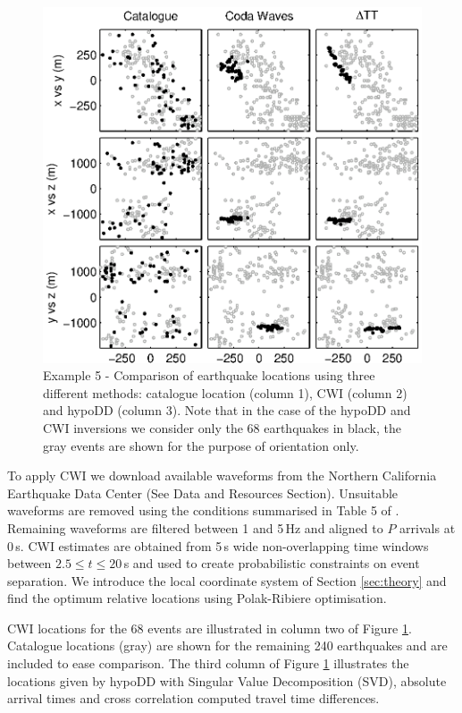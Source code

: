 \documentclass[extra, onecolumn, doublespacing]{gji}
\begin{document}
\begin{figure}
\includegraphics{diags/CalaverasLoc1_hypoDD_SVD.eps}
\caption{Example 5 - Comparison of earthquake locations using three
different methods: catalogue location (column 1), CWI (column 2) and
hypoDD (column 3). Note that in the case of the hypoDD and CWI
inversions we consider only the 68 earthquakes in black, the gray
events are shown for the purpose of orientation only.}
\label{fig-69Calaverasevents_eg1}
\end{figure}

To apply CWI we download available waveforms from the Northern
California Earthquake Data Center (See Data and Resources Section).
Unsuitable waveforms are removed using the conditions summarised in
Table 5 of \citet{dr_Robinson11a}. Remaining waveforms are filtered
between 1 and 5\,Hz and aligned  to $P$ arrivals at 0\,s. CWI
estimates are obtained from 5\,s wide non-overlapping time windows
between $2.5 \leq t \leq 20$\,s and used to create probabilistic
constraints on event separation. We introduce the local coordinate
system of Section \ref{sec:theory} and find the optimum relative
locations using Polak-Ribiere optimisation.

CWI locations for the 68 events are illustrated in column two of
Figure \ref{fig-69Calaverasevents_eg1}. Catalogue locations (gray)
are shown for the remaining 240 earthquakes and are included to ease
comparison. The third column of Figure
\ref{fig-69Calaverasevents_eg1} illustrates the locations given by
hypoDD with Singular Value Decomposition (SVD), absolute arrival
times and cross correlation computed travel time differences.
\end{document}
